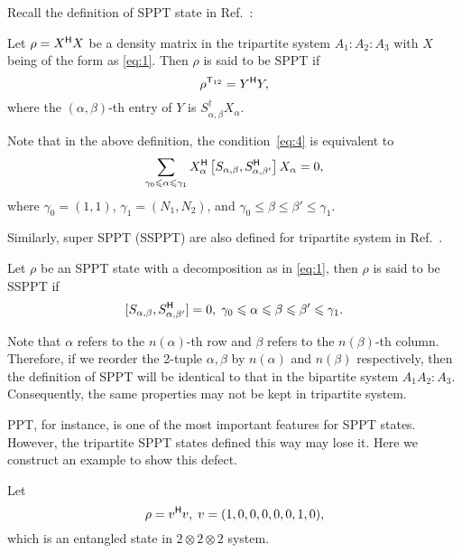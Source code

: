 Recall the definition of SPPT state in Ref.~\cite{SPPT3partite}:
\begin{defi}
  Let $\rho=X^{\mathsf{H}}X$ be a density matrix in the tripartite system $A_1:A_2:A_3$ with $X$ being of  the form as \cref{eq:1}. Then
  $\rho$ is said to be  SPPT if
  \begin{equation}
    \label{eq:4}
    \rho^{\mathsf{T}_{12}} = Y^{\mathsf{H}} Y,
  \end{equation}
  where the $(\alpha,\beta )$-th entry of $Y$ is $S^\dagger_{\alpha,\beta}X_\alpha$.
\end{defi}

Note that in the above definition, the condition~\eqref{eq:4} is equivalent to
\begin{equation}
  \label{eq:5}
  \sum_{\gamma_0\leqslant \alpha\leqslant \gamma_1} X_{\alpha}^{\mathsf{H}}\left[S_{\alpha,\beta},S_{\alpha,\beta'}^{\mathsf{H}}\right] X_{\alpha}=0,
\end{equation}
where  $\gamma_0 = (1,1)$, $\gamma_1  = (N_1,N_2)$,  and $\gamma_0 \leqslant\beta\leqslant\beta'\leqslant \gamma_1$.

Similarly, super SPPT (SSPPT) are also defined for tripartite system in Ref.~\cite{SPPT3partite}.
\begin{defi}
  Let $\rho$ be an SPPT state with a decomposition as in \cref{eq:1}, then $\rho$ is said to be SSPPT if
  \begin{equation}
    \label{ssppt3}
    [S_{\alpha,\beta},S^{\mathsf{H}}_{\alpha,\beta'}] = 0, \; \gamma_0\leqslant\alpha\leqslant \beta \leqslant \beta' \leqslant \gamma_1.
  \end{equation}
\end{defi}

Note that $\alpha$ refers to the $n(\alpha)$-th row and $\beta$ refers to the $n(\beta)$-th column. Therefore, if we
reorder the 2-tuple $\alpha,\beta$ by $n(\alpha)$ and $n(\beta)$ respectively, then the definition of
SPPT will be identical to that in the bipartite system $A_1A_2:A_3$. Consequently, the same  properties  may not be kept in
tripartite system.  

 PPT, for instance,  is one of the most important features for SPPT states. However, the tripartite SPPT states
 defined this way may lose it. Here we construct an example to show this defect.

Let
\begin{equation*}
 \rho = v^{\mathsf{H}} v,\; v = (1,0,0,0,0,0,1,0),
\end{equation*}
which is an entangled state in  $2\otimes  2\otimes 2$ system.

